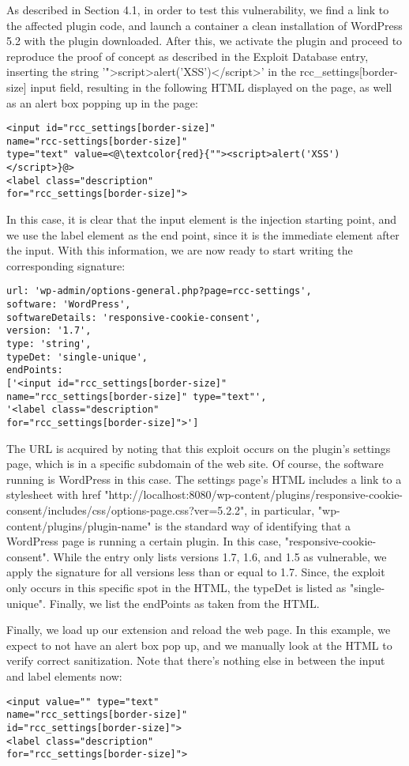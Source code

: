  As described in Section 4.1, in order to test this vulnerability, we find a link to the affected plugin code, and launch a container a clean installation of WordPress 5.2 with the plugin downloaded. After this, we activate the plugin and proceed to reproduce the proof of concept as described in the Exploit Database entry, inserting the string '">script>alert('XSS')</script>' in the rcc\_settings[border-size] input field, resulting in the following HTML displayed on the page, as well as an alert box popping up in the page:

\begin{lstlisting}
<input id="rcc_settings[border-size]" 
name="rcc-settings[border-size]" 
type="text" value=<@\textcolor{red}{""><script>alert('XSS')</script>}@>
<label class="description"
for="rcc_settings[border-size]">
\end{lstlisting}

In this case, it is clear that the input element is the injection starting point, and we use the label element as the end point, since it is the immediate element after the input. With this information, we are now ready to start writing the corresponding signature:

 \lstset{basicstyle=\small}
\begin{lstlisting}
url: 'wp-admin/options-general.php?page=rcc-settings',
software: 'WordPress',
softwareDetails: 'responsive-cookie-consent',
version: '1.7',
type: 'string',
typeDet: 'single-unique',
endPoints: 
['<input id="rcc_settings[border-size]" 
name="rcc_settings[border-size]" type="text"',
'<label class="description" 
for="rcc_settings[border-size]">']
\end{lstlisting}

The URL is acquired by noting that this exploit occurs on the plugin's settings page, which is in a specific subdomain of the web site. Of course, the software running is WordPress in this case. The settings page's HTML includes a link to a stylesheet with href "http://localhost:8080/wp-content/plugins/responsive-cookie-consent/includes/css/options-page.css?ver=5.2.2", in particular, "wp-content/plugins/plugin-name" is the standard way of identifying that a WordPress page is running a certain plugin. In this case, "responsive-cookie-consent". While the entry only lists versions 1.7, 1.6, and 1.5 as vulnerable, we apply the signature for all versions less than or equal to 1.7.
Since, the exploit only occurs in this specific spot in the HTML, the typeDet is listed as "single-unique". Finally, we list the endPoints as taken from the HTML.

Finally, we load up our extension and reload the web page. In this example, we expect to not have an alert box pop up, and we manually look at the HTML to verify correct sanitization. Note that there's nothing else in between the input and label elements now:

\begin{lstlisting}
<input value="" type="text" 
name="rcc_settings[border-size]" 
id="rcc_settings[border-size]">
<label class="description"
for="rcc_settings[border-size]">
\end{lstlisting}


